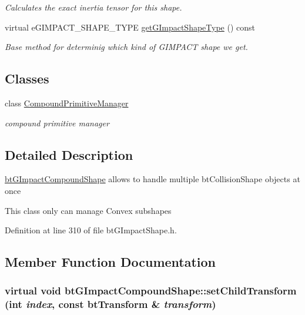 \begin{CompactItemize}
\begin{CompactList}\small\item\em Calculates the exact inertia tensor for this shape. \item\end{CompactList}\item 
virtual eGIMPACT\_\-SHAPE\_\-TYPE \hyperlink{classbt_g_impact_compound_shape_861967c52cb52a358b8d99aa4c65e306}{getGImpactShapeType} () const 
\begin{CompactList}\small\item\em Base method for determinig which kind of GIMPACT shape we get. \item\end{CompactList}\end{CompactItemize}
\subsection*{Classes}
\begin{CompactItemize}
\item 
class \hyperlink{classbt_g_impact_compound_shape_1_1_compound_primitive_manager}{CompoundPrimitiveManager}
\begin{CompactList}\small\item\em compound primitive manager \item\end{CompactList}\end{CompactItemize}


\subsection{Detailed Description}
\hyperlink{classbt_g_impact_compound_shape}{btGImpactCompoundShape} allows to handle multiple btCollisionShape objects at once 

This class only can manage Convex subshapes 

Definition at line 310 of file btGImpactShape.h.

\subsection{Member Function Documentation}
\hypertarget{classbt_g_impact_compound_shape_560410e20842ad73227d7712a574385c}{
\subsubsection[setChildTransform]{\setlength{\rightskip}{0pt plus 5cm}virtual void btGImpactCompoundShape::setChildTransform (int {\em index}, \/  const btTransform \& {\em transform})}}
\label{classbt_g_impact_compound_shape_560410e20842ad73227d7712a574385c}


